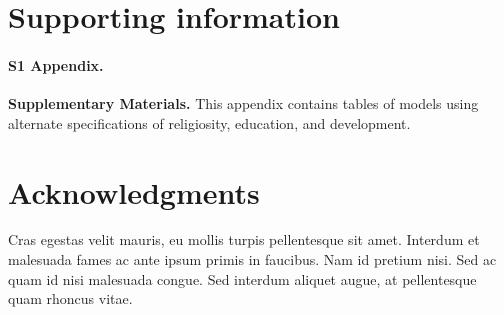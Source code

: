 \documentclass[10pt,letterpaper]{article}
\begin{document}
\section*{Supporting information}

\paragraph*{S1 Appendix.}
\label{S1_Appendix}
{\bf Supplementary Materials.}  This appendix contains tables of models using alternate specifications of religiosity, education, and development.

\section*{Acknowledgments}
Cras egestas velit mauris, eu mollis turpis pellentesque sit amet. Interdum et malesuada fames ac ante ipsum primis in faucibus. Nam id pretium nisi. Sed ac quam id nisi malesuada congue. Sed interdum aliquet augue, at pellentesque quam rhoncus vitae.

\nolinenumbers
\end{document}
